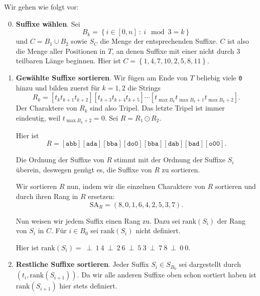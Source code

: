 Wir gehen wie folgt vor:
\begin{enumerate}
  \setcounter{enumi}{-1}
  \item \textbf{Suffixe wählen}. \quad Sei 
  \begin{equation*}
    B_k = \left \{ i \in [0,n] \ : \ i \mod 3 = k \right \}
  \end{equation*}
  und \( C = B_1 \cup B_2 \) sowie \( S_C \) die Menge der entsprechenden Suffixe. \( C \) ist also die Menge aller Positionen in \( T \), an denen Suffixe mit einer nicht durch \( 3 \) teilbaren Länge beginnen. Hier ist \( C = \left \{ 1,4,7,10,2,5,8,11 \right \} \).
  
  \item \textbf{Gewählte Suffixe sortieren}. \quad Wir fügen am Ende von \( T \) beliebig viele \texttt{0} hinzu und bilden zuerst für \( k = 1,2 \) die Strings
  \begin{equation*}
    R_k = [t_k t_{k+1} t_{k+2}][t_{k+3}t_{k+4}t_{k+5}]\cdots[t_{\max B_k}t_{\max B_{k}+1}t_{\max B_k +2}]\text{.}
  \end{equation*}
  Der Charaktere von \( R_k \) sind also Tripel. Das letzte Tripel ist immer eindeutig, weil \( t_{\max B_k + 2} = 0 \). Sei \( R = R_1 \odot R_2 \).

  Hier ist
  \begin{equation*}
    R = [\texttt{abb}][\texttt{ada}][\texttt{bba}][\texttt{do0}][\texttt{bba}][\texttt{dab}][\texttt{bad}][\texttt{o00}]\text{.}
  \end{equation*}

  Die Ordnung der Suffixe von \( R \) stimmt mit der Ordnung der Suffixe \( S_i \) überein, deswegen genügt es, die Suffixe von \( R \) zu sortieren.

  Wir sortieren \( R \) nun, indem wir die einzelnen Charaktere von \( R \) sortieren und durch ihren Rang in \( R \) ersetzen:
  \begin{equation*}
    \text{SA}_{R} = \left( 8,0,1,6,4,2,5,3,7 \right)\text{.}
  \end{equation*}

  Nun weisen wir jedem Suffix einen Rang zu. Dazu sei \( \text{rank}(S_i) \) der Rang von \( S_i \) in \( C \). Für \( i \in B_0 \) sei \( \text{rank}(S_i) \) nicht definiert.

  Hier ist \( \text{rank}(S_i) = \ \perp \ 1 \ 4 \ \perp \ 2 \ 6 \ \perp \ 5 \ 3 \ \perp \ 7 \ 8 \  \perp \ 0 \ 0 \).

  \item \textbf{Restliche Suffixe sortieren}. \quad Jeder Suffix \( S_i \in S_{B_0} \) sei dargestellt durch \( \left( t_i, \text{rank}(S_{i+1}) \right) \). Da wir alle anderen Suffixe oben schon sortiert haben ist \( \text{rank}(S_{i+1}) \) hier stets definiert.


\end{enumerate}
